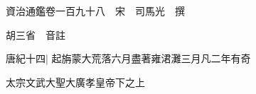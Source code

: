






























































資治通鑑卷一百九十八　宋　司馬光　撰

胡三省　音註

唐紀十四|{
	起旃蒙大荒落六月盡著雍涒灘三月凡二年有奇}


太宗文武大聖大廣孝皇帝下之上

